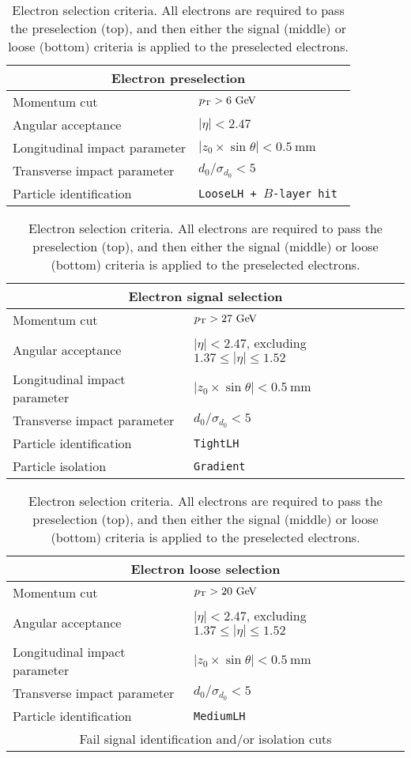 \begin{table}[htbp]
  \centering
  \begin{tabular}{l l}
    \multicolumn{2}{c}{Electron preselection} \\ 
    \hline\hline
    Momentum cut                  & $\pt > 6\gev$ \\
    Angular acceptance            & $|\eta| < 2.47$ \\
    Longitudinal impact parameter & $|z_0\times\sin\theta| < 0.5~\textrm{mm}$ \\
    Transverse impact parameter   & $d_0/\sigma_{d_{0}} < 5$ \\
    Particle identification       & \tt{LooseLH} + $B$-layer hit \\
    \hline
  \end{tabular}

  \vspace{8mm}

  \begin{tabular}{l l}
    \multicolumn{2}{c}{Electron signal selection} \\ 
    \hline\hline
    Momentum cut                  & $\pt > 27\gev$ \\
    Angular acceptance            & $|\eta| < 2.47$, excluding $1.37 \le |\eta| \le 1.52$ \\
    Longitudinal impact parameter & $|z_0\times\sin\theta| < 0.5~\textrm{mm}$ \\
    Transverse impact parameter   & $d_0/\sigma_{d_{0}} < 5$ \\
    Particle identification       & \tt{TightLH} \\
    Particle isolation            & \tt{Gradient}\\
    \hline
  \end{tabular}

  \vspace{8mm}

  \begin{tabular}{l l}
    \multicolumn{2}{c}{Electron loose selection} \\ 
    \hline\hline
    Momentum cut                  & $\pt > 20\gev$ \\
    Angular acceptance            & $|\eta| < 2.47$, excluding $1.37 \le |\eta| \le 1.52$ \\
    Longitudinal impact parameter & $|z_0\times\sin\theta| < 0.5~\textrm{mm}$ \\
    Transverse impact parameter   & $d_0/\sigma_{d_{0}} < 5$ \\
    Particle identification       & \tt{MediumLH} \\
    \multicolumn{2}{c}{Fail signal identification and/or isolation cuts} \\
    \hline
  \end{tabular}
  \caption{Electron selection criteria.  All electrons are required to pass the preselection (top), and then either the signal (middle) or loose (bottom) criteria is applied to the preselected electrons.}
  \label{tab:ssww13tev_elec_selection}
\end{table}
